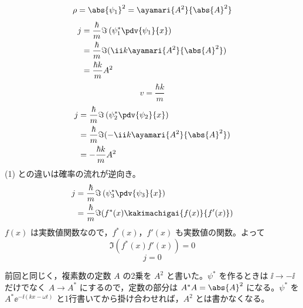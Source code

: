 \[ \rho=\abs{\psi_{1}}^{2}=\ayamari{A^{2}}{\abs{A}^{2}} \]
\begin{align*}
j&=\frac{\hbar}{m}\Im\left(\psi_{1}^{*}\pdv{\psi_{1}}{x}\right)\\
&=\frac{\hbar}{m}\Im(\ii k\ayamari{A^{2}}{\abs{A}^{2}})\\
&=\frac{\hbar k}{m}A^{2}
\end{align*}
\[ v=\frac{\hbar k}{m} \]
\begin{align*}
j&=\frac{\hbar}{m}\Im\left(\psi_{2}^{*}\pdv{\psi_{2}}{x}\right)\\
&=\frac{\hbar}{m}\Im(-\ii k\ayamari{A^{2}}{\abs{A}^{2}})\\
&=-\frac{\hbar k}{m}A^{2}
\end{align*}
(1) との違いは確率の流れが逆向き。
\begin{align*}
j&=\frac{\hbar}{m}\Im\left(\psi_{3}^{*}\pdv{\psi_{3}}{x}\right)\\
&=\frac{\hbar}{m}\Im(f^{*}(x)\kakimachigai{f(x)}{f'(x)})
\end{align*}
$f(x)$ は実数値関数なので，$f^{*}(x)$，$f'(x)$ も実数値の関数。よって
\[ \Im(f^{*}(x)f'(x))=0 \]
\[ j=0 \]
\item {} 前回と同じく，複素数の定数 $A$ の2乗を $A^{2}$ と書いた。$\psi^{*}$ を作るときは $\ii\to-\ii$ だけでなく $A\to A^{*}$ にするので，定数の部分は $A^{*}A=\abs{A}^{2}$ になる。$\psi^{*}$ を $A^{*}\ee^{-\ii(kx-\omega t)}$ と1行書いてから掛け合わせれば，$A^{2}$ とは書かなくなる。

